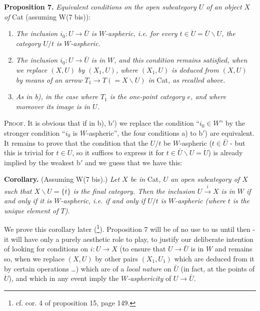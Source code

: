 \textbf{Proposition 7.} \textit{Equivalent conditions on the open subcategory $U$ of an object $X$ of} Cat (assuming W(7 bis)):

\begin{enumerate}[label={}, leftmargin=*]
\item[\textit{a)}] \textit{The inclusion $i_0:U\longrightarrow\bar U$ is $W$-aspheric, i.e. for every $t\in\dot U=\bar U\backslash U$, the category $U/t$ is $W$-aspheric.}
\item[\textit{b)}] \textit{The inclusion $i_0:U\longrightarrow\bar U$ is in $W$, and this condition remains satisfied, when we replace $(X,U)$ by $(X_1,U)$, where $(X_1,U)$ is deduced from $(X,U)$ by means of an arrow $T_1\longrightarrow T(=X\backslash U)$ in} Cat\textit{, as recalled above.}
\item[\textit{b$'$)}] \textit{As in b), in the case where $T_1$ is the one-point category $e$, and where moreover its image is in $\dot U$.}
\end{enumerate}

\textsc{Proof}. It is obvious that if in b), b$'$) we replace the condition ``$i_0\in W$'' by the stronger condition ``$i_0$ is $W$-aspheric'', the four conditions a) to b$'$) are equivalent. It remains to prove that the condition that the $U/t$ be $W$-aspheric ($t\in\bar U$ - but this is trivial for $t\in U$, so it suffices to express it for $t\in\bar U\backslash U=\dot U$) is already implied by the weakest b$'$ and we guess that we have this:


\textbf{Corollary.} (Assuming W(7 bis).) \textit{Let $X$ be in} Cat\textit{, $U$ an open subcategory of $X$ such that $X\backslash U=\overline{\{t\}}$ is the final category. Then the inclusion $U\xrightarrow{i}X$ is in $W$ if and only if it is $W$-aspheric, i.e. if and only if $U/t$ is $W$-aspheric (where $t$ is the unique element of $T$).}

We prove this corollary later (\footnote[65]{cf. cor. 4 of proposition 15, page 149.}). Proposition 7 will be of no use to us until then - it will have only a purely aesthetic role to play, to justify our deliberate intention of looking for conditions on $i:U\longrightarrow X$ (to ensure that $U\longrightarrow\bar U$ is in $W$ and remains so, when we replace $(X,U)$ by other pairs $(X_1,U_1)$ which are deduced from it by certain operations \dots) which
are of a \textit{local nature} on $\bar U$ (in fact, at the points of $\dot U$), and which in any event imply the \textit{$W$-asphericity} of $U\longrightarrow\bar U$.

